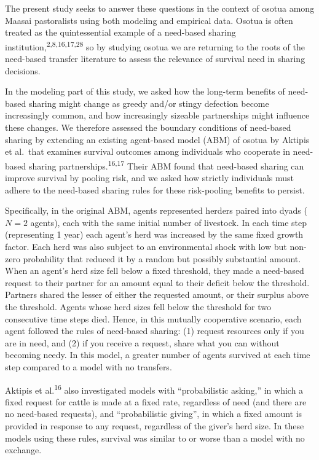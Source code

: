 \documentclass[
]{article}
\begin{document}
The present study seeks to answer these questions in the context of osotua among Maasai pastoralists using both modeling and empirical data. Osotua is often treated as the quintessential example of a need-based sharing institution,\textsuperscript{2,8,16,17,28} so by studying osotua we are returning to the roots of the need-based transfer literature to assess the relevance of survival need in sharing decisions.

In the modeling part of this study, we asked how the long-term benefits of need-based sharing might change as greedy and/or stingy defection become increasingly common, and how increasingly sizeable partnerships might influence these changes. We therefore assessed the boundary conditions of need-based sharing by extending an existing agent-based model (ABM) of osotua by Aktipis et al.~that examines survival outcomes among individuals who cooperate in need-based sharing partnerships.\textsuperscript{16,17} Their ABM found that need-based sharing can improve survival by pooling risk, and we asked how strictly individuals must adhere to the need-based sharing rules for these risk-pooling benefits to persist.

Specifically, in the original ABM, agents represented herders paired into dyads (\(N=2\) agents), each with the same initial number of livestock. In each time step (representing 1 year) each agent's herd was increased by the same fixed growth factor. Each herd was also subject to an environmental shock with low but non-zero probability that reduced it by a random but possibly substantial amount. When an agent's herd size fell below a fixed threshold, they made a need-based request to their partner for an amount equal to their deficit below the threshold. Partners shared the lesser of either the requested amount, or their surplus above the threshold. Agents whose herd sizes fell below the threshold for two consecutive time steps died. Hence, in this mutually cooperative scenario, each agent followed the rules of need-based sharing: (1) request resources only if you are in need, and (2) if you receive a request, share what you can without becoming needy. In this model, a greater number of agents survived at each time step compared to a model with no transfers.

Aktipis et al.\textsuperscript{16} also investigated models with ``probabilistic asking,'' in which a fixed request for cattle is made at a fixed rate, regardless of need (and there are no need-based requests), and ``probabilistic giving'', in which a fixed amount is provided in response to any request, regardless of the giver's herd size. In these models using these rules, survival was similar to or worse than a model with no exchange.
\end{document}
